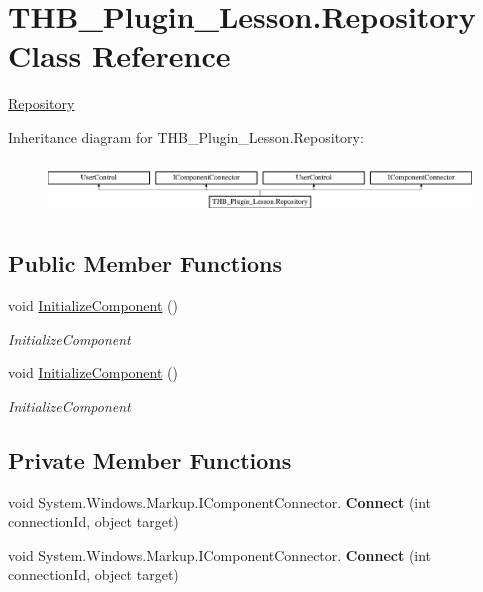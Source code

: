 \hypertarget{class_t_h_b___plugin___lesson_1_1_repository}{}\section{T\+H\+B\+\_\+\+Plugin\+\_\+\+Lesson.\+Repository Class Reference}
\label{class_t_h_b___plugin___lesson_1_1_repository}


\mbox{\hyperlink{class_t_h_b___plugin___lesson_1_1_repository}{Repository}}  


Inheritance diagram for T\+H\+B\+\_\+\+Plugin\+\_\+\+Lesson.\+Repository\+:\begin{figure}[H]
\begin{center}
\leavevmode
\includegraphics[height=1.421320cm]{d1/df2/class_t_h_b___plugin___lesson_1_1_repository}
\end{center}
\end{figure}
\subsection*{Public Member Functions}
\begin{DoxyCompactItemize}
\item 
void \mbox{\hyperlink{class_t_h_b___plugin___lesson_1_1_repository_afdf074d19e7e43f5cb9388fefdcc42d0}{Initialize\+Component}} ()
\begin{DoxyCompactList}\small\item\em Initialize\+Component \end{DoxyCompactList}\item 
void \mbox{\hyperlink{class_t_h_b___plugin___lesson_1_1_repository_afdf074d19e7e43f5cb9388fefdcc42d0}{Initialize\+Component}} ()
\begin{DoxyCompactList}\small\item\em Initialize\+Component \end{DoxyCompactList}\end{DoxyCompactItemize}
\subsection*{Private Member Functions}
\begin{DoxyCompactItemize}
\item 
\mbox{\label{class_t_h_b___plugin___lesson_1_1_repository_a4fc89daa4cdaff9f9c61b46da60889fe}} 
void System.\+Windows.\+Markup.\+I\+Component\+Connector. {\bfseries Connect} (int connection\+Id, object target)
\item 
\mbox{\label{class_t_h_b___plugin___lesson_1_1_repository_a4fc89daa4cdaff9f9c61b46da60889fe}} 
void System.\+Windows.\+Markup.\+I\+Component\+Connector. {\bfseries Connect} (int connection\+Id, object target)
\end{DoxyCompactItemize}
